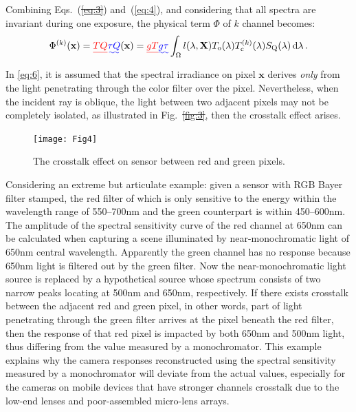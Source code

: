 \documentclass[9pt,twocolumn,twoside]{osajnl}
\newcommand{\D}{\mathrm{d}}
\providecommand{\DIFadd}[1]{{\protect\color{blue}\uwave{#1}}} %
\providecommand{\DIFdel}[1]{{\protect\color{red}\sout{#1}}}                      %
\providecommand{\DIFaddbegin}{} %
\providecommand{\DIFaddend}{} %
\providecommand{\DIFdelbegin}{} %
\providecommand{\DIFdelend}{} %
\providecommand{\DIFaddbeginFL}{} %
\providecommand{\DIFaddendFL}{} %
\providecommand{\DIFdelbeginFL}{} %
\providecommand{\DIFdelendFL}{} %
\begin{document}
Combining Eqs.~(\DIFdelbegin \DIFdel{\ref{eq:3}}\DIFdelend \DIFaddbegin \DIFadd{\ref{eq:2}}\DIFaddend ) and~(\ref{eq:4}), and considering that all spectra are invariant during one exposure, the physical term $\Phi$ of $k$ channel becomes:
\begin{equation}
\Phi^{(k)}(\mathbf{x}) = \DIFdelbegin \DIFdel{TQ}\DIFdelend \DIFaddbegin \DIFadd{\tau Q}\DIFaddend (\mathbf{x}) = \DIFdelbegin \DIFdel{gT}\DIFdelend \DIFaddbegin \DIFadd{g\tau}\DIFaddend \int_\Omega{}l(\lambda,\mathbf{X})T_\text{o}(\lambda )T_\text{c}^{(k)}(\lambda)S_\text{Q}(\lambda)\,\D{\lambda}\,.
\label{eq:6}
\end{equation}

In \eqref{eq:6}, it is assumed that the spectral irradiance on pixel $\mathbf{x}$ derives \textit{only} from the light penetrating through the color filter over the pixel. Nevertheless, when the incident ray is oblique, the light between two adjacent pixels may not be completely isolated, as illustrated in Fig.~\DIFdelbegin \DIFdel{\ref{fig:3}}\DIFdelend \DIFaddbegin \DIFadd{\ref{fig:4}}\DIFaddend , then the crosstalk effect arises.

\begin{figure}[tbp]
	\centering
	\DIFdelbeginFL %
\DIFdelendFL \DIFaddbeginFL \texttt{[image: Fig4]}
	\DIFaddendFL \caption{The crosstalk effect on sensor between red and green pixels.}
	\DIFdelbeginFL %
\DIFdelendFL \DIFaddbeginFL \label{fig:4}
\DIFaddendFL \end{figure}

Considering an extreme but articulate example: given a sensor with RGB Bayer filter stamped, the red filter of which is only sensitive to the energy within the wavelength range of 550--700nm and the green counterpart is within 450--600nm. The amplitude of the spectral sensitivity curve of the red channel at 650nm can be calculated when capturing a scene illuminated by near-monochromatic light of 650nm central wavelength. Apparently the green channel has no response because 650nm light is filtered out by the green filter. Now the near-monochromatic light source is replaced by a hypothetical source whose spectrum consists of two narrow peaks locating at 500nm and 650nm, respectively. If there exists crosstalk between the adjacent red and green pixel, in other words, part of light penetrating through the green filter arrives at the pixel beneath the red filter, then the response of that red pixel is impacted by both 650nm and 500nm light, thus differing from the value measured by a monochromator. This example explains why the camera responses reconstructed using the spectral sensitivity measured by a monochromator will deviate from the actual values, especially for the cameras on mobile devices that have stronger channels crosstalk due to the low-end lenses and poor-assembled micro-lens arrays.
\end{document}
